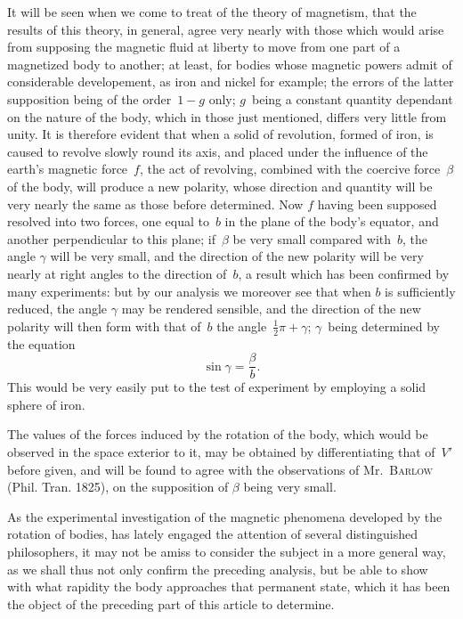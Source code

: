 \documentclass[12pt,notitlepage]{amsart}
\let\Person\textsc
\begin{document}
It will be seen when we come to treat of the theory of magnetism,
that the results of this theory, in general, agree very nearly with those which
would arise from supposing the magnetic fluid at liberty to move from one
part of a magnetized body to another; at least, for bodies whose magnetic
powers admit of considerable developement, as iron and nickel for example;
the errors of the latter supposition being of the order~$1-g$ only; $g$~being
a constant quantity dependant on the nature of the body, which in those just
mentioned, differs very little from unity. It is therefore evident that when
a solid of revolution, formed of iron, is caused to revolve slowly round its
axis, and placed under the influence of the earth's magnetic force~$f$, the act
of revolving, combined with the coercive force~$\beta$ of the body, will produce
a new polarity, whose direction and quantity will be very nearly the same
as those before determined. Now $f$ having been supposed resolved into two
forces, one equal to~$b$ in the plane of the body's equator, and another 
perpendicular to this plane;
if~$\beta$ be very small compared with~$b$, the angle $\gamma$
will be very small, and the direction of the new polarity will be very nearly
at right angles to the direction of~$b$, a result which has been confirmed by
many experiments: but by our analysis we moreover see that when $b$ is 
sufficiently reduced, the angle $\gamma$ may be rendered sensible,
and the direction of
the new polarity will then form with that of~$b$
the angle~$\tfrac12\pi+\gamma$; $\gamma$~being
determined by the equation
\[
\sin\gamma=\frac\beta b.
\]
This would be very easily put to the test of experiment by employing a
solid sphere of iron.

The values of the forces induced by the rotation of the body, which
would be observed in the space exterior to it, may be obtained by 
differentiating that of~$V'$ before given,
and will be found to agree with the observations
of Mr.~\Person{Barlow} (Phil. Tran. 1825),
on the supposition of $\beta$ being
very small.

As the experimental investigation of the magnetic phenomena developed
by the rotation of bodies,
has lately engaged the attention of several distinguished
philosophers, it may not be amiss to consider the subject in a more general
way, as we shall thus not only confirm the preceding analysis, but be able
to show with what rapidity the body approaches that permanent state, which
it has been the object of the preceding part of this article to determine.
\end{document}
